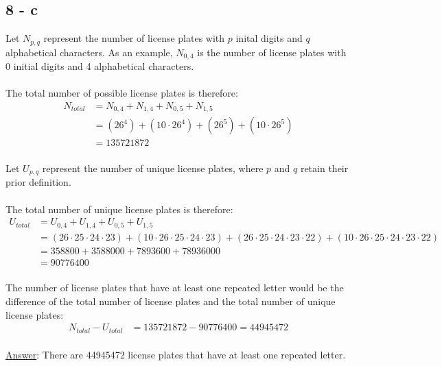 \documentclass[12pt]{article}
\begin{document}
\subsection*{8 - c}
Let $N_{p,q}$ represent the number of license plates with $p$ inital digits and $q$ alphabetical characters. 
As an example, $N_{0,4}$ is the number of license plates with 0 initial digits and 4 alphabetical characters.
\\ \\
The total number of possible license plates is therefore:
\begin{align*}
  N_{total} &= N_{0,4} + N_{1,4} + N_{0,5} + N_{1,5} \\
  &= (26^4) + (10\cdot26^4) + (26^5) + (10\cdot26^5) \\
  &= 135721872
\end{align*}
\\ 
Let $U_{p,q}$ represent the number of unique license plates, where $p$ and $q$ retain their prior definition.
\\ \\
The total number of unique license plates is therefore:
\begin{align*}
  U_{total} &= U_{0,4} + U_{1,4} + U_{0,5} + U_{1,5} \\
  &= (26\cdot25\cdot24\cdot23) + (10\cdot26\cdot25\cdot24\cdot23) + (26\cdot25\cdot24\cdot23\cdot22) + (10\cdot26\cdot25\cdot24\cdot23\cdot22) \\
  &= 358800 + 3588000 + 7893600 + 78936000 \\
  &= 90776400
\end{align*}
\\
The number of license plates that have at least one repeated letter would be the difference of the total number of license plates and the total number of unique license plates:
\begin{align*}
  N_{total} - U_{total} &= 135721872 - 90776400 = 44945472
\end{align*}
\\
\underline{Answer}: There are 44945472 license plates that have at least one repeated letter.
\end{document}
